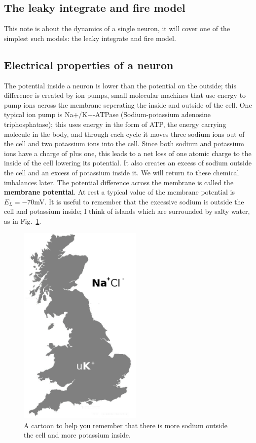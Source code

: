\documentclass{article}
\begin{document}
\subsection*{The leaky integrate and fire model}
This note is about the dynamics of a single neuron, it will cover
one of the simplest such models: the leaky integrate and fire model.

\subsection*{Electrical properties of a neuron}
The potential inside a neuron is lower than the potential on the
outside; this difference is created by ion pumps, small molecular
machines that use energy to pump ions across the membrane seperating
the inside and outside of the cell. One typical ion pump is
Na+/K+-ATPase (Sodium-potassium adenosine triphosphatase); this uses
energy in the form of ATP, the energy carrying molecule in the body,
and through each cycle it moves three sodium ions out of the cell and
two potassium ions into the cell. Since both sodium and potassium ions
have a charge of plus one, this leads to a net loss of one atomic
charge to the inside of the cell lowering its potential. It also
creates an excess of sodium outside the cell and an excess of
potassium inside it. We will return to these chemical imbalances
later. The potential difference across the membrane is called the
\textbf{membrane potential}. At rest a typical value of the membrane
potential is $E_L=-70 $mV. It is useful to remember that the excessive
sodium is outside the cell and potassium inside; I think of islands
which are surrounded by salty water, as in Fig.~\ref{in_out}.


\begin{figure}
\begin{center}
\includegraphics[width=6cm]{in_out}
\end{center}
\caption{A cartoon to help you remember that there is more sodium outside the cell and more potassium inside.\label{in_out}}
\end{figure}
\end{document}
